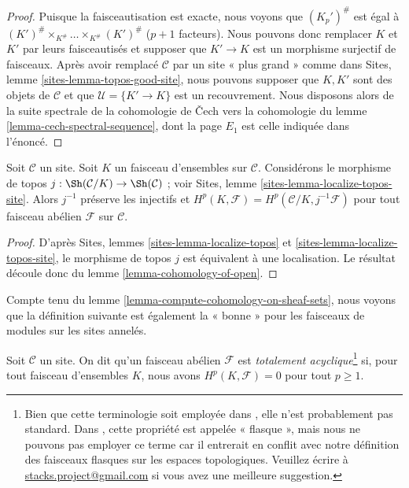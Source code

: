 \begin{proof}
Puisque la faisceautisation est exacte, nous voyons que
$(K_p')^\#$ est égal à
$(K')^\# \times_{K^\#} \ldots \times_{K^\#} (K')^\#$
($p + 1$ facteurs). Nous pouvons donc remplacer $K$ et $K'$ par leurs
faisceautisés et supposer que $K' \to K$ est un morphisme surjectif de
faisceaux. Après avoir remplacé $\mathcal{C}$ par un site « plus grand » comme
dans Sites, lemme \ref{sites-lemma-topos-good-site}, nous pouvons supposer que
$K, K'$ sont des objets de $\mathcal{C}$ et que
$\mathcal{U} = \{K' \to K\}$ est un recouvrement. Nous disposons alors de la
suite spectrale de la cohomologie de {\v C}ech vers la cohomologie du
lemme \ref{lemma-cech-spectral-sequence}, dont la page $E_1$ est celle indiquée
dans l'énoncé.
\end{proof}

\begin{lemma}
\label{lemma-cohomology-on-sheaf-sets}
Soit $\mathcal{C}$ un site. Soit $K$ un faisceau d'ensembles sur
$\mathcal{C}$. Considérons le morphisme de topos
$j : \Sh(\mathcal{C}/K) \to \Sh(\mathcal{C})$ ; voir
Sites, lemme \ref{sites-lemma-localize-topos-site}.
Alors $j^{-1}$ préserve les injectifs et
$H^p(K, \mathcal{F}) = H^p(\mathcal{C}/K, j^{-1}\mathcal{F})$
pour tout faisceau abélien $\mathcal{F}$ sur $\mathcal{C}$.
\end{lemma}

\begin{proof}
D'après Sites, lemmes \ref{sites-lemma-localize-topos} et
\ref{sites-lemma-localize-topos-site}, le morphisme de topos $j$ est équivalent
à une localisation. Le résultat découle donc du
lemme \ref{lemma-cohomology-of-open}.
\end{proof}

\noindent
Compte tenu du lemme \ref{lemma-compute-cohomology-on-sheaf-sets}, nous voyons
que la définition suivante est également la « bonne » pour les faisceaux de
modules sur les sites annelés.

\begin{definition}
\label{definition-limp}
Soit $\mathcal{C}$ un site.
On dit qu'un faisceau abélien $\mathcal{F}$ est
{\it totalement acyclique}\footnote{Bien que cette terminologie soit employée
dans \cite[Vbis, Proposition 1.3.10]{SGA4}, elle n'est probablement pas
standard. Dans \cite[V, définition 4.1]{SGA4}, cette propriété est appelée
« flasque », mais nous ne pouvons pas employer ce terme car il entrerait en
conflit avec notre définition des faisceaux flasques sur les espaces
topologiques. Veuillez écrire à
\href{mailto:stacks.project@gmail.com}{stacks.project@gmail.com}
si vous avez une meilleure suggestion.} si, pour tout faisceau d'ensembles
$K$, nous avons $H^p(K, \mathcal{F}) = 0$ pour tout $p \geq 1$.
\end{definition}

